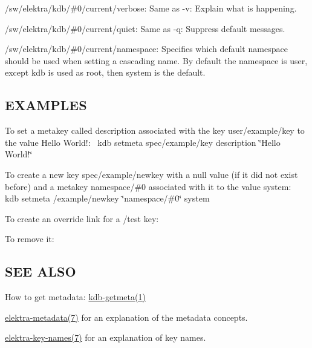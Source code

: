 \begin{DoxyItemize}
\item {\ttfamily /sw/elektra/kdb/\#0/current/verbose}\+: Same as {\ttfamily -\/v}\+: Explain what is happening.
\item {\ttfamily /sw/elektra/kdb/\#0/current/quiet}\+: Same as {\ttfamily -\/q}\+: Suppress default messages.
\item {\ttfamily /sw/elektra/kdb/\#0/current/namespace}\+: Specifies which default namespace should be used when setting a cascading name. By default the namespace is {\ttfamily user}, except {\ttfamily kdb} is used as root, then {\ttfamily system} is the default.
\end{DoxyItemize}

\subsection*{E\+X\+A\+M\+P\+L\+ES}

To set a metakey called {\ttfamily description} associated with the key {\ttfamily user/example/key} to the value {\ttfamily Hello World!}\+:~\newline
 {\ttfamily kdb setmeta spec/example/key description \char`\"{}\+Hello World!\char`\"{}}

To create a new key {\ttfamily spec/example/newkey} with a null value (if it did not exist before) and a metakey {\ttfamily namespace/\#0} associated with it to the value {\ttfamily system}\+:~\newline
 {\ttfamily kdb setmeta /example/newkey \char`\"{}namespace/\#0\char`\"{} system}

To create an override link for a {\ttfamily /test} key\+: 


To remove it\+: 


\subsection*{S\+EE A\+L\+SO}


\begin{DoxyItemize}
\item How to get metadata\+: \hyperlink{md_doc_help_kdb-getmeta_doc_help_kdb-getmeta_md}{kdb-\/getmeta(1)}
\item \hyperlink{md_doc_help_elektra-metadata_doc_help_elektra-metadata_md}{elektra-\/metadata(7)} for an explanation of the metadata concepts.
\item \hyperlink{md_doc_help_elektra-key-names_doc_help_elektra-key-names_md}{elektra-\/key-\/names(7)} for an explanation of key names. 
\end{DoxyItemize}